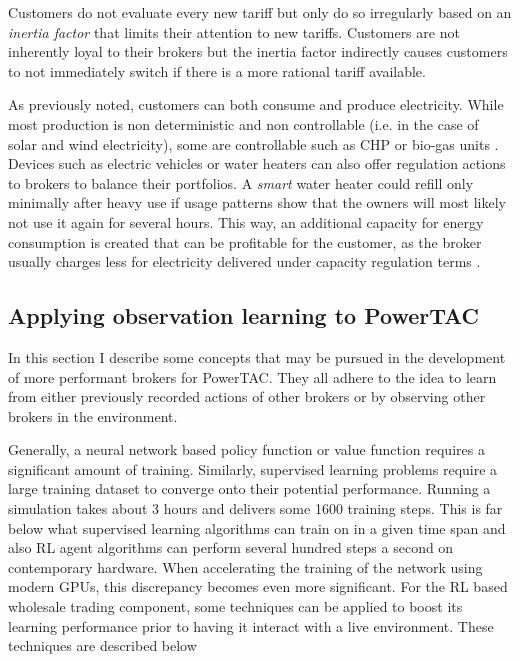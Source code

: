 Customers do not evaluate every new tariff but only do so irregularly based on an \emph{inertia factor} that limits
their attention to new tariffs. Customers are not inherently loyal to their brokers but the inertia factor
indirectly causes customers to not immediately switch if there is a more rational tariff available.

As previously noted, customers can both consume and produce electricity. While most production is non deterministic
and non controllable (i.e. in the case of solar and wind electricity), some are controllable such as \ac{CHP} or
bio-gas units \citep[p.16]{ketter2018powertac}. Devices such as electric vehicles or water heaters can also offer
regulation actions to brokers to balance their portfolios. A \emph{smart} water heater could refill only minimally
after heavy use if usage patterns show that the owners will most likely not use it again for several hours. This
way, an additional capacity for energy consumption is created that can be profitable for the customer, as the broker
usually charges less for electricity delivered under capacity regulation terms \citep[p.14ff.]{ketter2018powertac}.

\subsection{Applying observation learning to PowerTAC}%
\label{sub:applying_observation_learning_to_powertac}

In this section I describe some concepts that may be pursued in the development of more performant brokers for
\ac{PowerTAC}. They all adhere to the idea to learn from either previously recorded actions of other brokers or by
observing other brokers in the environment.

Generally, a neural network based policy function or value function requires
a significant amount of training. Similarly, supervised learning problems require a large training dataset to converge
onto their potential performance. Running a simulation takes about 3 hours and delivers some 1600 training steps. This
is far below what supervised learning algorithms can train on in a given time span and also \ac{RL} agent algorithms can
perform several hundred steps a second on contemporary hardware. When accelerating the training of the network using
modern \ac{GPU}s, this discrepancy becomes even more significant. For the \ac{RL} based wholesale trading component,
some techniques can be applied to boost its learning performance prior to having it interact with a live environment.
These techniques are described below

